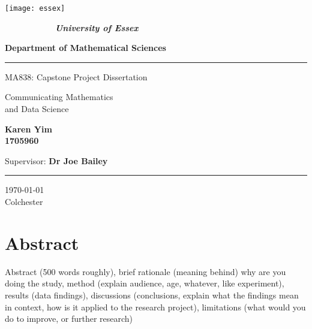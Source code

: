 \documentclass[12pt, a4paper,oneside]{book}
\numberwithin{equation}{section}
\begin{document}
\thispagestyle{empty}

\begin{minipage}{0.2\textwidth}
\centerline{\texttt{[image: essex]} }
\end{minipage}
\begin{minipage}{0.8\textwidth}

$ \qquad \qquad \qquad ${\LARGE \bf \sl University of Essex}

{\LARGE \bf Department of Mathematical Sciences}

\end{minipage}

\begin{center}

\noindent\textcolor{myred}{\rule{\linewidth}{4.8pt}}

\vspace{1cm}

{\LARGE \sc MA838: Capstone  Project Dissertation}

\vspace{1.5cm}

{\Huge{\color{myblue} Communicating Mathematics \\ and Data Science}}

\vspace{1.5cm}


{\Large \bf Karen Yim \\ 1705960}

\vspace{1.5cm}

\vspace{3cm}

\vspace{1.5cm}

{\Large {Supervisor:} {\color{mygreen} \bf  Dr Joe Bailey}}

\vspace{.25cm}

\noindent\textcolor{myred}{\rule{\linewidth}{4.8pt}}

\vspace{1cm}
{\Large \today }\\[4pt]
{\Large Colchester}

\end{center}

\newpage

\section*{Abstract}
Abstract (500 words roughly), brief rationale (meaning behind) why are you doing the study, method (explain audience, age, whatever, like experiment), results (data findings), discussions (conclusions, explain what the findings mean in context, how is it applied to the research project), limitations (what would you do to improve, or further research)
\end{document}
